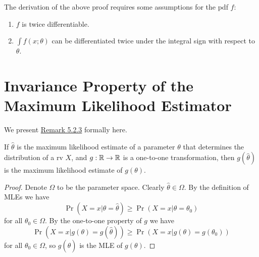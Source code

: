 \documentclass[11pt,fleqn]{book} %
\begin{document}
\begin{remark} \label{rmk:5314}
The derivation of the above proof requires some assumptions for the pdf \(f\):
\begin{enumerate}
\item \(f\) is twice differentiable.
\item \(\int f(x; \theta)\) can be differentiated twice under the integral sign with respect to \(\theta\).
\end{enumerate}
\end{remark}


\section{Invariance Property of the Maximum Likelihood Estimator}

\begin{remark} \label{rmk:541}
We present \hyperref[rmk:523]{Remark 5.2.3} formally here.
\end{remark}

\begin{theorem}
\label{thm:542}
If \(\hat{\theta}\) is the maximum likelihood estimate of a parameter \(\theta\) that determines the distribution of a rv \(X\), and \(g:\mathbb{R}\rightarrow\mathbb{R}\) is a one-to-one transformation, then \(g(\hat{\theta})\) is the maximum likelihood estimate of \(g(\theta)\).
\end{theorem}
\begin{proof}
Denote \(\Omega\) to be the parameter space. Clearly \(\hat{\theta} \in \Omega\). By the definition of MLEs we have
\[
\Pr(X = x|\theta = \hat{\theta}) \geq \Pr(X = x|\theta = \theta_0)
\]
for all \(\theta_0 \in \Omega\). By the one-to-one property of \(g\) we have
\[
\Pr(X = x|g(\theta) = g(\hat{\theta})) \geq \Pr(X = x|g(\theta) = g(\theta_0))
\]
for all \(\theta_0 \in \Omega\), so \(g(\hat{\theta})\) is the MLE of \(g(\theta)\).
\end{proof}
\end{document}
